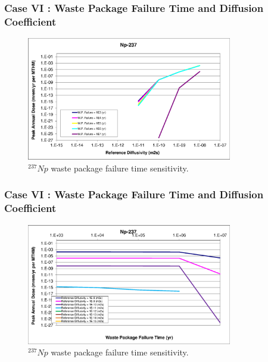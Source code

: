 \begin{frame}[c]
  \frametitle{Case VI : Waste Package Failure Time and Diffusion Coefficient}

\begin{figure}[ht!]
\centering
\includegraphics[width=0.8\textwidth]{WPFailExtended/Np-237.eps}
\caption{$^{237}Np$ waste package failure time sensitivity. }
\label{fig:WPFailNp237}
\end{figure}
\end{frame}

\begin{frame}[c]
  \frametitle{Case VI : Waste Package Failure Time and Diffusion Coefficient}

\begin{figure}[ht!]
\centering
\includegraphics[width=0.8\textwidth]{WPFailExtended/Np-237-WPFail.eps}
\caption{$^{237}Np$ waste package failure time sensitivity. }
\label{fig:WPFailPuDaughters}
\end{figure}
\end{frame}

